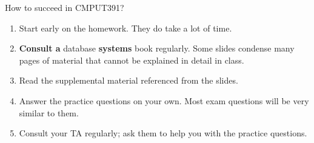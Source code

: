 \documentclass[xcolor={usenames,dvipsnames}]{beamer}
\begin{document}

\begin{frame}{How to succeed in CMPUT391?}

\begin{enumerate}[label=(\arabic*)]

\item Start early on the homework. They do take a lot of time.

\item \alert{\textbf{Consult a}} database \textbf{systems} \alert{book} regularly. Some slides condense many pages of material that cannot be explained in detail in class.

\item Read the supplemental material referenced from the slides.

\item \alert{Answer the practice questions} on your own. Most exam questions will be very similar to them.

\item Consult your TA regularly; ask them to help you with the practice questions.
\end{enumerate}

\end{frame}
\end{document}
